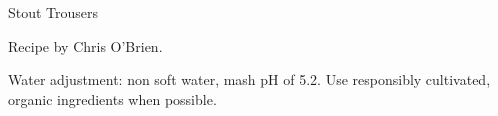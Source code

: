 \begin{recipe}{Stout Trousers} %

\begin{aboutblock}
Recipe by Chris O'Brien. 
\end{aboutblock}


\begin{methodandtiming}
 
\begin{mashsteps}
\end{mashsteps}

\begin{fermentationsteps}
\end{fermentationsteps}

\begin{directions}
Water adjustment: non soft water, mash pH of 5.2. Use responsibly cultivated,
organic ingredients when possible.
\end{directions}

\end{methodandtiming}

\recipebreak

\begin{ingredientsblock}

\begin{malts}
\end{malts}

\begin{hops}
\end{hops}


\end{ingredientsblock}

\end{recipe}

